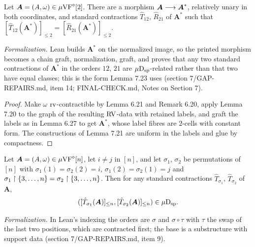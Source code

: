 \setcounter{theorem}{21}
\begin{lemma}
\label{subset-partitioned-2-unit-contracted}
\leanok
{}
Let $\boldsymbol{A} = (A, \omega) \in \mu\mathrm{VF}^\diamond[2]$. There are a morphism $\boldsymbol{A} \longrightarrow \boldsymbol{A}^*$, relatively unary in both coordinates, and standard contractions $\hat T_{12}$, $\hat R_{21}$ of $\boldsymbol{A}^*$ such that $[\hat T_{12}(\boldsymbol{A}^*)]_{\leq 2} = [\hat R_{21}(\boldsymbol{A}^*)]_{\leq 2}$.

\emph{Formalization.} Lean builds $\boldsymbol{A}^*$ on the normalized image, so the printed morphism becomes a chain graft, normalization, graft, and proves that any two standard contractions of $\boldsymbol{A}^*$ in the orders $12$, $21$ are $\mu\mathrm{D}_{\mathrm{sp}}$-related rather than that two have equal classes; this is the form Lemma 7.23 uses (section 7/GAP-REPAIRS.md, item 14; FINAL-CHECK.md, Notes on Section 7).
\end{lemma}

\begin{proof}
Make $\omega$ $\operatorname{rv}$-contractible by Lemma 6.21 and Remark 6.20, apply Lemma 7.20 to the graph of the resulting $\mathrm{RV}$-data with retained labels, and graft the labels as in Lemma 6.27 to get $\boldsymbol{A}^*$, whose label fibres are $2$-cells with constant form. The constructions of Lemma 7.21 are uniform in the labels and glue by compactness.
\end{proof}

\setcounter{theorem}{22}
\begin{lemma}
\label{contraction-perm-pair-isp}
\leanok
{}
Let $\boldsymbol{A} = (A, \omega) \in \mu\mathrm{VF}^\diamond[n]$, let $i \neq j$ in $[n]$, and let $\sigma_1$, $\sigma_2$ be permutations of $[n]$ with $\sigma_1(1) = \sigma_2(2) = i$, $\sigma_1(2) = \sigma_2(1) = j$ and $\sigma_1 \upharpoonright \{3, \ldots, n\} = \sigma_2 \upharpoonright \{3, \ldots, n\}$. Then for any standard contractions $\hat T_{\sigma_1}$, $\hat T_{\sigma_2}$ of $\boldsymbol{A}$,\[ ([\hat T_{\sigma_1}(\boldsymbol{A})]_{\leq n}, [\hat T_{\sigma_2}(\boldsymbol{A})]_{\leq n}) \in \mu\mathrm{D}_{\mathrm{sp}}. \]

\emph{Formalization.} In Lean's indexing the orders are $\sigma$ and $\sigma \circ \tau$ with $\tau$ the swap of the last two positions, which are contracted first; the base is a substructure with support data (section 7/GAP-REPAIRS.md, item 9).
\end{lemma}

